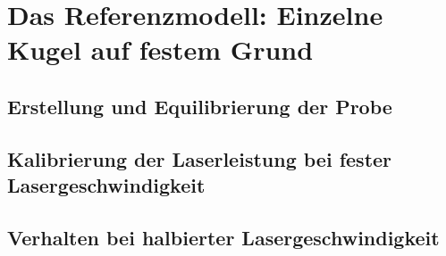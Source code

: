 \chapter{Das Referenzmodell: Einzelne Kugel auf festem Grund}



\section{Erstellung und Equilibrierung der Probe}

\section{Kalibrierung der Laserleistung bei fester Lasergeschwindigkeit}

\section{Verhalten bei halbierter Lasergeschwindigkeit}
